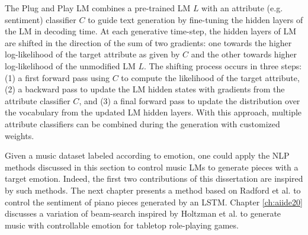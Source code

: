 The Plug and Play LM \cite{dathathri2019plug} combines a pre-trained LM $L$ with an attribute (e.g. sentiment) classifier $C$ to guide text generation by fine-tuning the hidden layers of the LM in decoding time. At each generative time-step, the hidden layers of LM are shifted in the direction of the sum of two gradients: one towards the higher log-likelihood of the target attribute as given by $C$ and the other towards higher log-likelihood of the unmodified LM $L$. The shifting process occurs in three steps: (1) a first forward pass using $C$ to compute the likelihood of the target attribute, (2) a backward pass to update the LM hidden states with gradients from the attribute classifier $C$, and (3) a final forward pass to update the distribution over the vocabulary from the updated LM hidden layers. With this approach, multiple attribute classifiers can be combined during the generation with customized weights.


Given a music dataset labeled according to emotion, one could apply the NLP methods discussed in this section to control music LMs to generate pieces with a target emotion. Indeed, the first two contributions of this dissertation are inspired by such methods. The next chapter presents a method based on Radford et al. \cite{radford_2017} to control the sentiment of piano pieces generated by an LSTM. Chapter \ref{ch:aiide20} discusses a variation of beam-search inspired by Holtzman et al. \cite{holtzman2018learning} to generate music with controllable emotion for tabletop role-playing games.
